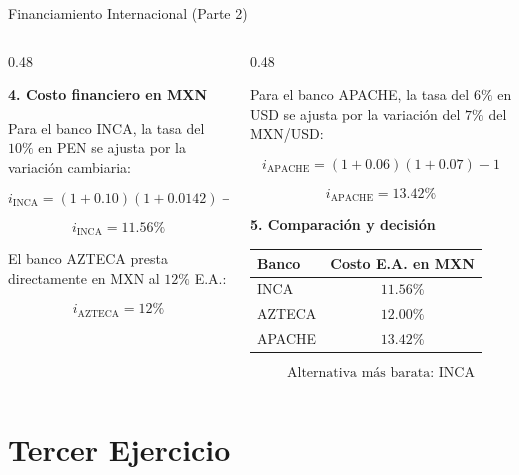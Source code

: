 \documentclass[10pt]{beamer}
\begin{document}
\begin{frame}{Financiamiento Internacional (Parte 2)}

\small

\begin{columns}[T,onlytextwidth]

\begin{column}{0.48\textwidth}

\textbf{4. Costo financiero en MXN}

Para el banco INCA, la tasa del \(10\%\) en PEN se ajusta por la variación cambiaria:

\[
i_{\text{INCA}}=(1+0.10)(1+0.0142)-1
\]

\[
\boxed{i_{\text{INCA}}=11.56\%}
\]

El banco AZTECA presta directamente en MXN al \(12\%\) E.A.:

\[
\boxed{i_{\text{AZTECA}}=12\%}
\]

\end{column}

\begin{column}{0.48\textwidth}

Para el banco APACHE, la tasa del \(6\%\) en USD se ajusta por la variación del \(7\%\) del MXN/USD:

\[
i_{\text{APACHE}}=(1+0.06)(1+0.07)-1
\]

\[
\boxed{i_{\text{APACHE}}=13.42\%}
\]

\textbf{5. Comparación y decisión}

\begin{table}
\centering
\footnotesize
\begin{tabular}{lc}
\hline
\textbf{Banco} & \textbf{Costo E.A. en MXN}\\
\hline
INCA & \(11.56\%\)\\
AZTECA & \(12.00\%\)\\
APACHE & \(13.42\%\)\\
\hline
\end{tabular}
\end{table}

\[
\boxed{\text{Alternativa más barata: INCA}}
\]

\end{column}

\end{columns}

\end{frame}

\section{Tercer Ejercicio}
\end{document}

